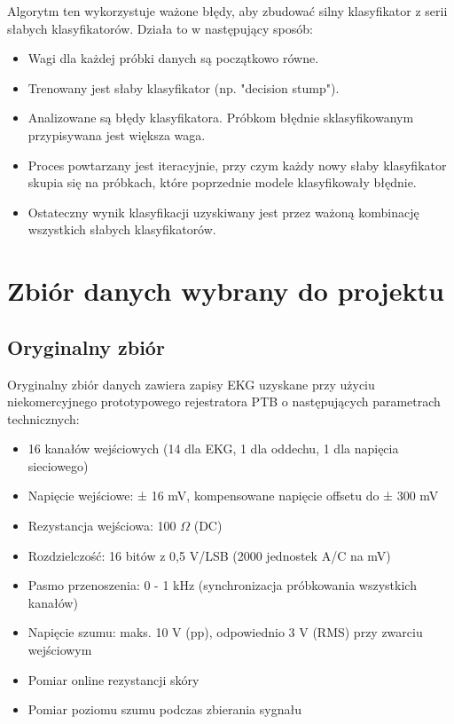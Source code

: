 \documentclass[12pt,a4paper]{article}
\begin{document}
Algorytm ten wykorzystuje ważone błędy, aby zbudować silny klasyfikator z serii słabych klasyfikatorów. Działa to w następujący sposób:
\begin{itemize}
    \item Wagi dla każdej próbki danych są początkowo równe.
    \item Trenowany jest słaby klasyfikator (np. "decision stump").
    \item Analizowane są błędy klasyfikatora. Próbkom błędnie sklasyfikowanym przypisywana jest większa waga.
    \item Proces powtarzany jest iteracyjnie, przy czym każdy nowy słaby klasyfikator skupia się na próbkach, które poprzednie modele klasyfikowały błędnie.
    \item Ostateczny wynik klasyfikacji uzyskiwany jest przez ważoną kombinację wszystkich słabych klasyfikatorów.
\end{itemize}



\section{Zbiór danych wybrany do projektu}

\subsection{Oryginalny zbiór}
Oryginalny zbiór danych \cite{ptb-diagnostic-ecg-database} zawiera zapisy EKG uzyskane przy użyciu niekomercyjnego prototypowego rejestratora PTB o następujących parametrach technicznych:
\begin{itemize}
    \item 16 kanałów wejściowych (14 dla EKG, 1 dla oddechu, 1 dla napięcia sieciowego)
    \item Napięcie wejściowe: ± 16 mV, kompensowane napięcie offsetu do ± 300 mV
    \item Rezystancja wejściowa: 100 $\Omega$ (DC)
    \item Rozdzielczość: 16 bitów z 0,5 \micro V/LSB (2000 jednostek A/C na mV)
    \item Pasmo przenoszenia: 0 - 1 kHz (synchronizacja próbkowania wszystkich kanałów)
    \item Napięcie szumu: maks. 10 \micro V (pp), odpowiednio 3 \micro V (RMS) przy zwarciu wejściowym
    \item Pomiar online rezystancji skóry
    \item Pomiar poziomu szumu podczas zbierania sygnału
\end{itemize}
\end{document}
